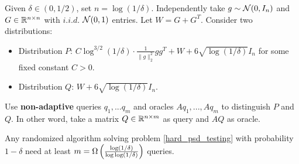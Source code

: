 \documentclass[10pt]{book}
\begin{document}
\begin{prob}
    \label{hard_psd_testing}
    Given $\delta\in(0,1/2)$, set $n=\log(1/\delta)$. Independently take $g\sim\mathcal{N}(0,I_n)$ and $G\in\mathbb{R}^{n\times n}$ with $i.i.d.$ $\mathcal{N}(0,1)$ entries. Let $W=G+G^T$. Consider two distributions:
    \begin{itemize}
        \item Distribution $P$: $C\log^{3/2}(1/\delta)\cdot\frac{1}{\|g\|_2^2}gg^T + W + 6\sqrt{\log(1/\delta)}I_n$ for some fixed constant $C>0$.
        \item Distribution $Q$: $W + 6\sqrt{\log(1/\delta)}I_n$.
    \end{itemize}
    Use \textbf{non-adaptive} queries $q_1,...q_m$ and oracles $Aq_1,...,Aq_m$ to distinguish $P$ and $Q$. In other word, take a matrix $Q\in\mathbb{R}^{n\times m}$ as query and $AQ$ as oracle.
\end{prob}
\begin{thm}
    \label{hard_psd_testing_bound}
    Any randomized algorithm solving problem \ref{hard_psd_testing} with probability $1-\delta$ need at least $m=\Omega\left(\frac{\log(1/\delta)}{\log\log(1/\delta)}\right)$ queries. 
\end{thm}
\end{document}
